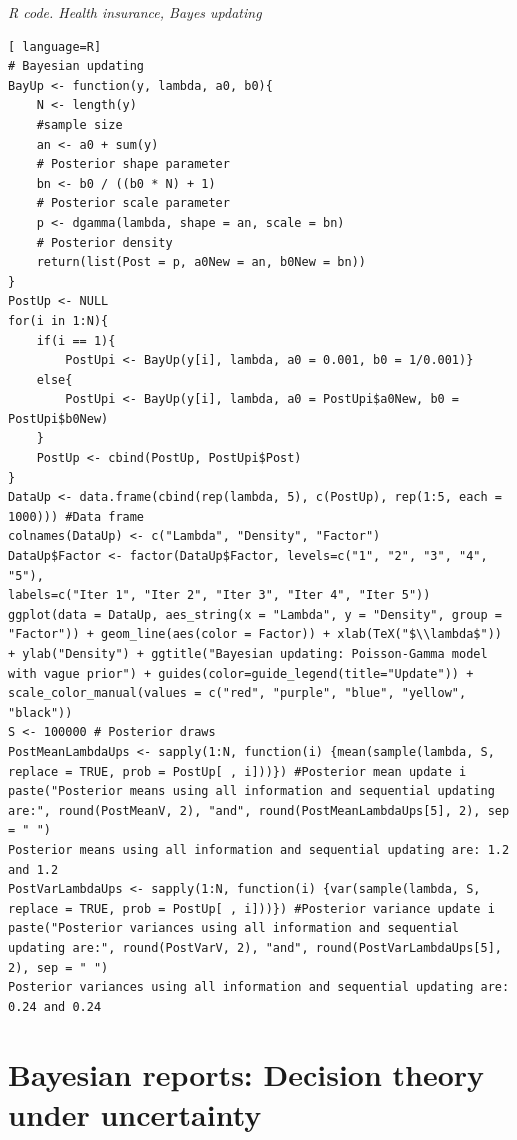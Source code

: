 \begin{tcolorbox}[enhanced,width=4.67in,center upper,
	fontupper=\large\bfseries,drop shadow southwest,sharp corners]
\textit{R code. Health insurance, Bayes updating}
\begin{VF}
\begin{lstlisting}[ language=R]
# Bayesian updating
BayUp <- function(y, lambda, a0, b0){
	N <- length(y)
	#sample size
	an <- a0 + sum(y) 
	# Posterior shape parameter
	bn <- b0 / ((b0 * N) + 1) 
	# Posterior scale parameter
	p <- dgamma(lambda, shape = an, scale = bn) 
	# Posterior density
	return(list(Post = p, a0New = an, b0New = bn))
}
PostUp <- NULL
for(i in 1:N){
	if(i == 1){
		PostUpi <- BayUp(y[i], lambda, a0 = 0.001, b0 = 1/0.001)}
	else{
		PostUpi <- BayUp(y[i], lambda, a0 = PostUpi$a0New, b0 = PostUpi$b0New)
	}
	PostUp <- cbind(PostUp, PostUpi$Post)
}
DataUp <- data.frame(cbind(rep(lambda, 5), c(PostUp), rep(1:5, each = 1000))) #Data frame
colnames(DataUp) <- c("Lambda", "Density", "Factor")
DataUp$Factor <- factor(DataUp$Factor, levels=c("1", "2", "3", "4", "5"), 
labels=c("Iter 1", "Iter 2", "Iter 3", "Iter 4", "Iter 5"))
ggplot(data = DataUp, aes_string(x = "Lambda", y = "Density", group = "Factor")) + geom_line(aes(color = Factor)) + xlab(TeX("$\\lambda$")) + ylab("Density") + ggtitle("Bayesian updating: Poisson-Gamma model with vague prior") + guides(color=guide_legend(title="Update")) + scale_color_manual(values = c("red", "purple", "blue", "yellow", "black"))
S <- 100000 # Posterior draws
PostMeanLambdaUps <- sapply(1:N, function(i) {mean(sample(lambda, S, replace = TRUE, prob = PostUp[ , i]))}) #Posterior mean update i
paste("Posterior means using all information and sequential updating are:", round(PostMeanV, 2), "and", round(PostMeanLambdaUps[5], 2), sep = " ")
Posterior means using all information and sequential updating are: 1.2 and 1.2 
PostVarLambdaUps <- sapply(1:N, function(i) {var(sample(lambda, S, replace = TRUE, prob = PostUp[ , i]))}) #Posterior variance update i
paste("Posterior variances using all information and sequential updating are:", round(PostVarV, 2), "and", round(PostVarLambdaUps[5], 2), sep = " ")
Posterior variances using all information and sequential updating are: 0.24 and 0.24
\end{lstlisting}
\end{VF}
\end{tcolorbox}

\section{Bayesian reports: Decision theory under uncertainty}\label{sec14}

